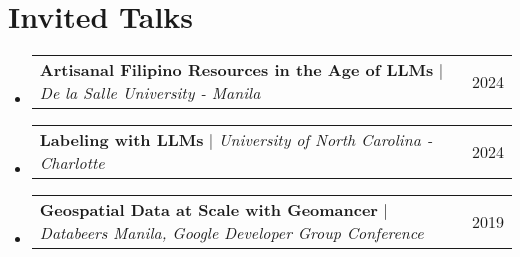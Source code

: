 \documentclass[letterpaper,10pt]{article}
\makeatletter
\newcommand{\resumeProjectHeading}[2]{
    \item
    \begin{tabular*}{0.97\textwidth}{l@{\extracolsep{\fill}}r}
      \small#1 & #2 \\
    \end{tabular*}\vspace{-7pt}
}
\newcommand{\resumeSubHeadingListStart}{\begin{itemize}[leftmargin=0.15in, label={}]}
\newcommand{\resumeSubHeadingListEnd}{\end{itemize}}
\makeatother
\begin{document}
\section{Invited Talks}
\resumeSubHeadingListStart
\resumeProjectHeading
{\textbf{Artisanal Filipino Resources in the Age of LLMs} $|$ \emph{De la Salle University - Manila}}{2024}
\resumeProjectHeading
{\textbf{Labeling with LLMs} $|$ \emph{University of North Carolina - Charlotte}}{2024}
\resumeProjectHeading
{\textbf{Geospatial Data at Scale with Geomancer} $|$ \emph{Databeers Manila, Google Developer Group Conference}}{2019}
\resumeSubHeadingListEnd


\newpage
\nocite{*}




\end{document}
